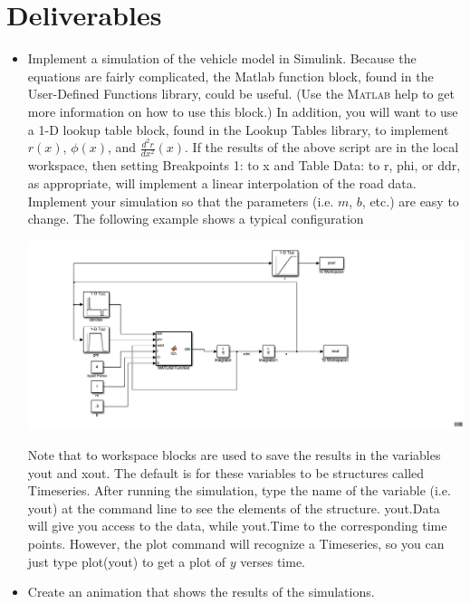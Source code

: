 \section{Deliverables}
\begin{itemize}
\item Implement a simulation of the vehicle model in Simulink. Because the equations are fairly complicated, the  \textsf{Matlab function} block, found in the User-Defined Functions library, could be useful. (Use the \textsc{Matlab} help to get more information on how to use this block.) In addition, you will want to use a \textsf{1-D lookup table} block, found in the Lookup Tables library, to implement $r(x)$, $\phi(x)$, and $\frac{d^2 r}{dx^2}(x)$. If the results of the above script are in the local workspace, then setting \textsf{Breakpoints 1:} to \textsf{x} and \textsf{Table Data:} to \textsf{r}, \textsf{phi}, or \textsf{ddr}, as appropriate, will implement a linear interpolation of the road data.  Implement your simulation so that the parameters (i.e. $m$, $b$, etc.) are easy to change.  The following example shows a typical configuration
\begin{center}
\includegraphics[width=6in]{Graphics/blockdiag}
\end{center}
Note that \textsf{to workspace} blocks are used to save the results in the variables \textsf{yout} and \textsf{xout}. The default is for these variables to be structures called Timeseries. After running the simulation, type the name of the variable (i.e. \textsf{yout}) at the command line to see the elements of the structure. \textsf{yout.Data} will give you access to the data, while \textsf{yout.Time} to the corresponding time points. However, the \textsf{plot} command will recognize a Timeseries, so you can just type \textsf{plot(yout)} to get a plot of $y$ verses time.
\item Create an animation that shows the results of the simulations.
\begin{itemize}

\end{itemize}
\end{itemize}

